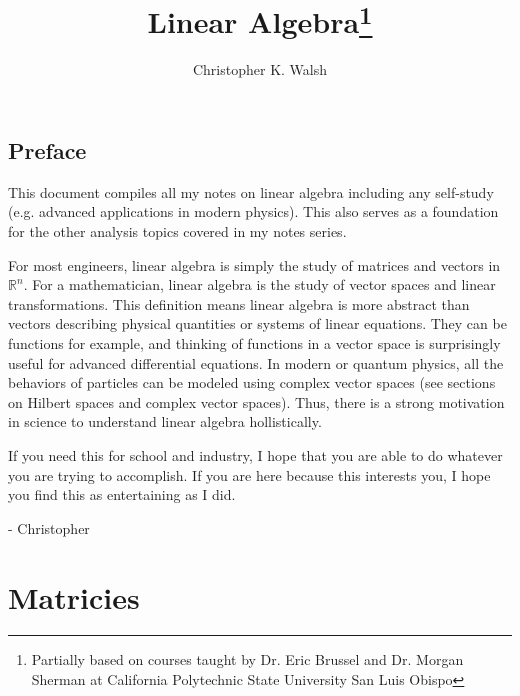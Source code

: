 \documentclass[12pt,openany]{book}
\title{Linear Algebra\thanks{Partially based on courses taught by Dr. Eric Brussel and Dr. Morgan Sherman at California Polytechnic State University San Luis Obispo}}
\author{Christopher K. Walsh}
\theoremstyle{mydefinitionstyle}
\theoremstyle{myexamplestyle}
\theoremstyle{remark}
\begin{document}
\maketitle
\tableofcontents

\newpage
\section*{Preface}
This document compiles all my notes on linear algebra including any self-study (e.g. advanced applications in modern physics).
This also serves as a foundation for the other analysis topics covered in my notes series.

For most engineers, linear algebra is simply the study of matrices and vectors in \( \mathbb{R}^n \).
For a mathematician, linear algebra is the study of vector spaces and linear transformations.
This definition means linear algebra is more abstract than vectors describing physical quantities or systems of linear equations.
They can be functions for example, and thinking of functions in a vector space is surprisingly useful for advanced differential equations.
In modern or quantum physics, all the behaviors of particles can be modeled using complex vector spaces (see sections on Hilbert spaces and complex vector spaces).
Thus, there is a strong motivation in science to understand linear algebra hollistically.

If you need this for school and industry, I hope that you are able to do whatever you are trying to accomplish.
If you are here because this interests you, I hope you find this as entertaining as I did.

- Christopher

\chapter{Matricies}

\end{document}
